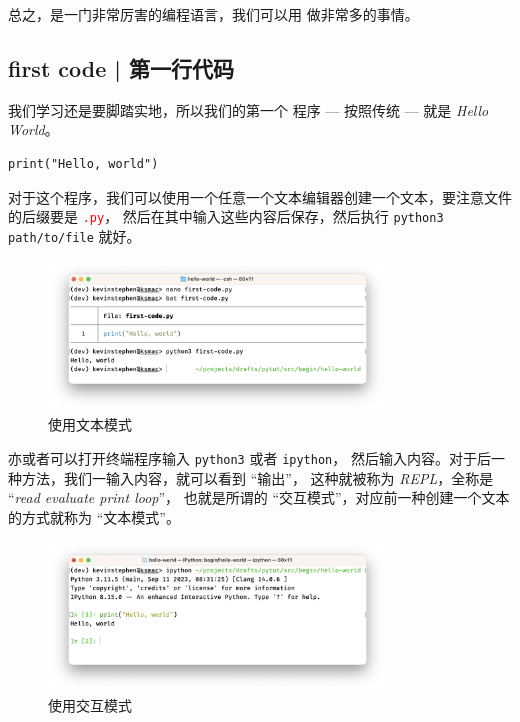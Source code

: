 总之，\Py 是一门非常厉害的编程语言，我们可以用 \Py 做非常多的事情。

\subsection{first code | 第一行代码}
\label{subsec:begin:hello-world:first-code}

我们学习还是要脚踏实地，所以我们的第一个 \Py 程序 --- 按照传统 --- 就是 \emph{Hello World}。

\begin{verbatim}
print("Hello, world")
\end{verbatim}

对于这个程序，我们可以使用一个任意一个文本编辑器创建一个文本，要注意文件的后缀要是 \textcolor{red}{\texttt{.py}}，
然后在其中输入这些内容后保存，然后执行 \verb|python3 path/to/file| 就好。

\begin{figure}[H]
    \centering
    \includegraphics[width=0.8\textwidth]{pics/begin-hello-world-first-code-01.png}
    \caption{使用文本模式}
    \label{fig:begin:hello-world:first-code:01}
\end{figure}

亦或者可以打开终端程序输入 \verb|python3| 或者 \verb|ipython|，
然后输入内容。对于后一种方法，我们一输入内容，就可以看到 ``输出''，
这种就被称为 \emph{REPL}，全称是 ``\emph{read evaluate print loop}''，
也就是所谓的 ``交互模式''，对应前一种创建一个文本的方式就称为 ``文本模式''。

\begin{figure}[H]
    \centering
    \includegraphics[width=0.8\textwidth]{pics/begin-hello-world-first-code-02.png}
    \caption{使用交互模式}
    \label{fig:begin:hello-world:first-code:02}
\end{figure}
